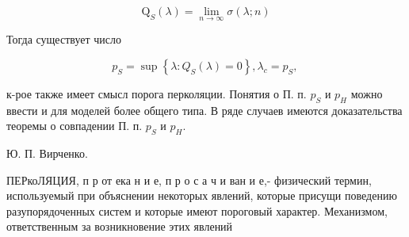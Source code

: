\documentclass[10pt]{article}
\begin{document}
\[

\mathrm{Q}_{S}(\lambda)=\lim _{n \rightarrow \infty} \sigma(\lambda ; n)

\]



Тогда существует число



\[

p_{S}=\sup \left\{\lambda: Q_{S}(\lambda)=0\right\}, \lambda_{c}=p_{S} \text {, }

\]



к-рое также имеет смысл порога перколяции. Понятия о П. п. $p_{S}$ и $p_{H}$ можно ввести и для моделей более общего типа. В ряде случаев имеются доказательства теоремы о совпадении П. п. $p_{S}$ и $p_{H}$.



Ю. П. Вирченко.



ПЕРкоЛЯЦИЯ, п р от ека н и е, п р о с а ч и ван и е,- физический термин, используемый при объяснении некоторых явлений, которые присущи поведению разупорядоченных систем и которые имеют пороговый характер. Механизмом, ответственным за возникновение этих явлений
\end{document}
